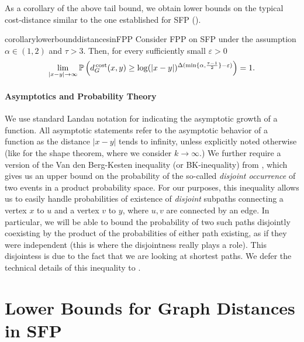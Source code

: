 \documentclass[11pt, letterpaper, margin=1in]{amsart}
\theoremstyle{definition}
\theoremstyle{remark}
\renewcommand{\Pr}[1]{\ensuremath{\mathbb{P} \left(#1 \right) }}
\newcommand{\SFFPP}{FPP\xspace}
\newcommand{\graphdistcost}[2]{d^{\hspace{.05cm}\text{cost}}_{G}(#1, #2)}
\numberwithin{equation}{section}
\begin{document}
As a corollary of the above tail bound, we obtain lower bounds on the typical cost-distance similar to the one established for SFP (). 

\begin{restatable}[Typical Graph Distances in \SFFPP{} on SFP]{corollary}{lowerbounddistancesinFPP}\label{cor:lowerboundFPP}
     Consider \SFFPP on SFP under the assumption $\alpha \in (1,2)$ and $\tau > 3$. Then, for every sufficiently small $\varepsilon > 0$ \begin{align*}
        \lim_{|x-y| \rightarrow \infty} \Pr{ \graphdistcost{x}{y} \ge \log(|x-y|)^{ \Delta(\min\{\alpha, \frac{\tau - 1}{2}\} -\varepsilon)}} = 1.
     \end{align*}
\end{restatable}

\paragraph{\textbf{Asymptotics and Probability Theory}}

We use standard Landau notation for indicating the asymptotic growth of a function. All asymptotic statements refer to the asymptotic behavior of a function as the distance $|x - y|$ tends to infinity, unless explicitly noted otherwise (like for the shape theorem, where we consider $k\to\infty$.) We further require a version of the Van den Berg-Kesten inequality (or BK-inequality) from \cite{Reimer_2000}, which gives us an upper bound on the probability of the so-called \emph{disjoint occurrence} of two events in a product probability space. For our purposes, this inequality allows us to easily handle probabilities of existence of \emph{disjoint} subpaths connecting a vertex $x$ to $u$ and a vertex $v$ to $y$, where $u, v$ are connected by an edge. In particular, we will be able to bound the probability of two such paths disjointly coexisting by the product of the probabilities of either path existing, as if they were independent (this is where the disjointness really plays a role). This disjointess is due to the fact that we are looking at shortest paths. We defer the technical details of this inequality to .

\section{Lower Bounds for Graph Distances in SFP}\label{sec:SFP}

\end{document}
